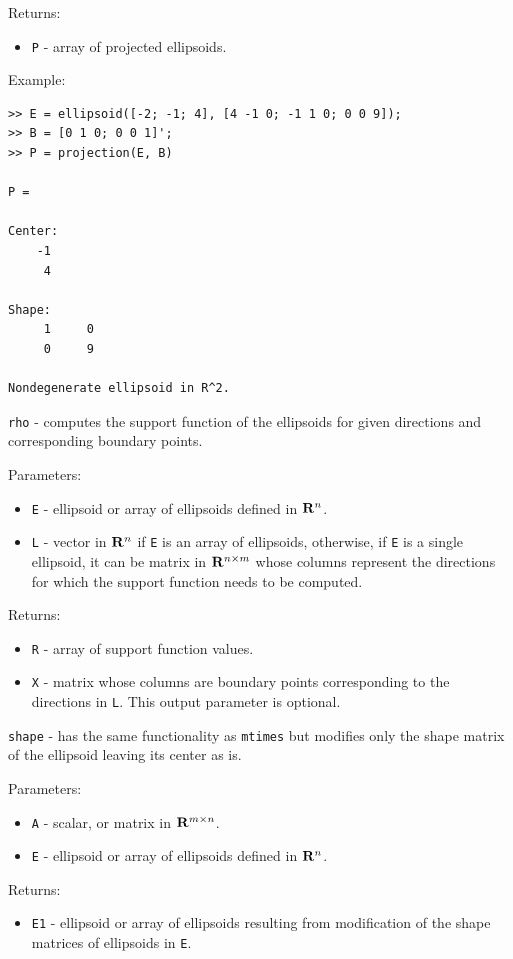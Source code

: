 \documentclass{report}
\begin{document}
Returns:
\begin{itemize}
\item {\tt P} - array of projected ellipsoids.
\end{itemize}

Example:
{\tt \begin{verbatim}
>> E = ellipsoid([-2; -1; 4], [4 -1 0; -1 1 0; 0 0 9]);
>> B = [0 1 0; 0 0 1]';
>> P = projection(E, B)

P =

Center:
    -1
     4

Shape:
     1     0
     0     9

Nondegenerate ellipsoid in R^2.
\end{verbatim} }

\newpage

{\Large {\tt rho}} - computes the support function of the ellipsoids for
given directions and corresponding boundary points.

Parameters:
\begin{itemize}
\item {\tt E} - ellipsoid or array of ellipsoids defined in ${\bf R}^n$.
\item {\tt L} - vector in ${\bf R}^n$ if {\tt E} is an array of ellipsoids,
otherwise, if {\tt E} is a single ellipsoid, it can be matrix in
${\bf R}^{n\times m}$ whose columns represent the directions for which
the support function needs to be computed.
\end{itemize}

Returns:
\begin{itemize}
\item {\tt R} - array of support function values.
\item {\tt X} - matrix whose columns are boundary points corresponding
to the directions in {\tt L}. This output parameter is optional.
\end{itemize}

\newpage

{\Large {\tt shape}} - has the same functionality as {\tt mtimes} but
modifies only the shape matrix of the ellipsoid leaving its center as is.

Parameters:
\begin{itemize}
\item {\tt A} - scalar, or matrix in ${\bf R}^{m\times n}$.
\item {\tt E} - ellipsoid or array of ellipsoids defined in ${\bf R}^n$.
\end{itemize}

Returns:
\begin{itemize}
\item {\tt E1} - ellipsoid or array of ellipsoids resulting from modification
of the shape matrices of ellipsoids in {\tt E}.
\end{itemize}
\end{document}
